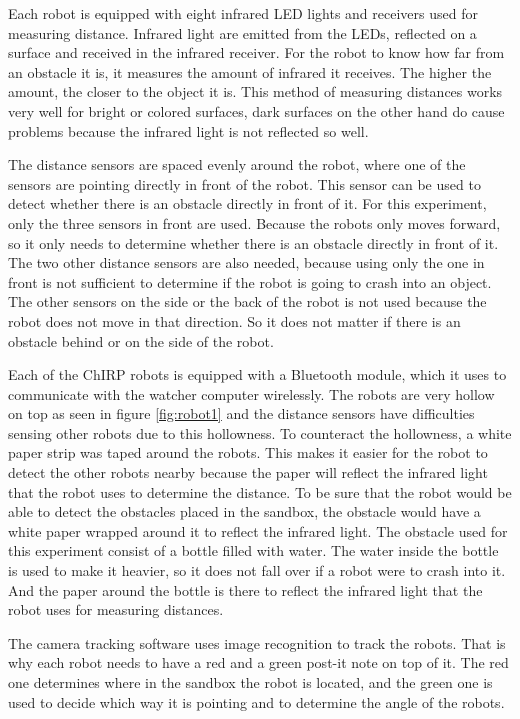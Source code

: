 Each robot is equipped with eight infrared LED lights and receivers used for measuring distance. Infrared light are emitted from the LEDs, reflected on a surface and received in the infrared receiver. For the robot to know how far from an obstacle it is, it measures the amount of infrared it receives. The higher the amount, the closer to the object it is. This method of measuring distances works very well for bright or colored surfaces, dark surfaces on the other hand do cause problems because the infrared light is not reflected so well.

The distance sensors are spaced evenly around the robot, where one of the sensors are pointing directly in front of the robot. This sensor can be used to detect whether there is an obstacle directly in front of it. For this experiment, only the three sensors in front are used. Because the robots only moves forward, so it only needs to determine whether there is an obstacle directly in front of it. The two other distance sensors are also needed, because using only the one in front is not sufficient to determine if the robot is going to crash into an object. The other sensors on the side or the back of the robot is not used because the robot does not move in that direction.
So it does not matter if there is an obstacle behind or on the side of the robot.

Each of the ChIRP robots is equipped with a Bluetooth module, which it uses to communicate with the watcher computer wirelessly. 
The robots are very hollow on top as seen in figure \ref{fig:robot1} and the distance sensors have difficulties sensing other robots due to this hollowness. To counteract the hollowness, a white paper strip was taped around the robots. This makes it easier for the robot to detect the other robots nearby because the paper will reflect the infrared light that the robot uses to determine the distance. To be sure that the robot would be able to detect the obstacles placed in the sandbox, the obstacle would have a white paper wrapped around it to reflect the infrared light. The obstacle used for this experiment consist of a bottle filled with water. The water inside the bottle is used to make it heavier, so it does not fall over if a robot were to crash into it. And the paper around the bottle is there to reflect the infrared light that the robot uses for measuring distances.

The camera tracking software uses image recognition to track the robots. That is why each robot needs to have a red and a green post-it note on top of it. The red one determines where in the sandbox the robot is located, and the green one is used to decide which way it is pointing and to determine the angle of the robots.

